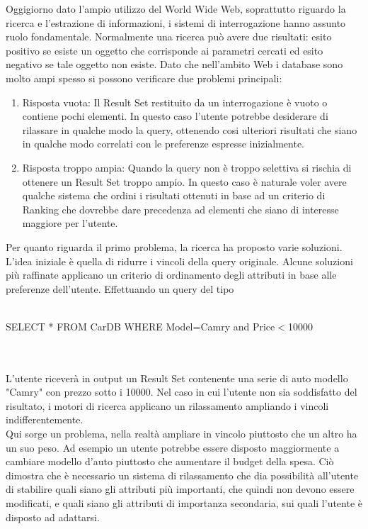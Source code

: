 Oggigiorno dato l'ampio utilizzo del World Wide Web, soprattutto riguardo la ricerca e l'estrazione di informazioni, i sistemi di interrogazione hanno assunto ruolo fondamentale.
Normalmente una ricerca può avere due risultati: esito positivo se esiste un oggetto che corrisponde ai parametri cercati ed esito negativo se tale oggetto non esiste.
Dato che nell'ambito Web i database sono molto ampi spesso si possono verificare due problemi principali:
\begin{enumerate}
    \item Risposta vuota: Il Result Set restituito da un interrogazione è vuoto o contiene pochi elementi. In questo caso l'utente potrebbe desiderare di rilassare in qualche modo la query, ottenendo cosi ulteriori risultati che siano in qualche modo correlati con le preferenze espresse inizialmente.
    \item Risposta troppo ampia: Quando la query non è troppo selettiva si rischia di ottenere un Result Set troppo ampio. In questo caso è naturale voler avere qualche sistema che ordini i risultati ottenuti in base ad un criterio di Ranking che dovrebbe dare precedenza ad elementi che siano di  interesse maggiore per l'utente.
\end{enumerate}

Per quanto riguarda il primo problema, la ricerca ha proposto varie soluzioni. L'idea iniziale è quella di ridurre i vincoli della query originale. Alcune soluzioni più raffinate applicano un criterio di ordinamento degli attributi in base alle preferenze dell'utente. Effettuando un query del tipo
\\~\\
\centerline{SELECT * FROM CarDB WHERE Model=Camry and Price$<$10000}
\\~\\
L'utente riceverà in output un Result Set contenente una serie di auto modello "Camry" con prezzo sotto i 10000. Nel caso in cui l'utente non sia soddisfatto del risultato, i motori di ricerca applicano un rilassamento ampliando i vincoli indifferentemente. \\
Qui sorge un problema, nella realtà ampliare in vincolo piuttosto che un altro ha un suo peso. Ad esempio un utente potrebbe essere disposto maggiormente a cambiare modello d'auto piuttosto che aumentare il budget della spesa. Ciò dimostra che è necessario un sistema di rilassamento che dia possibilità all'utente di stabilire quali siano gli attributi più importanti, che quindi non devono essere modificati, e quali siano gli attributi di importanza secondaria, sui quali l'utente è disposto ad adattarsi. 
